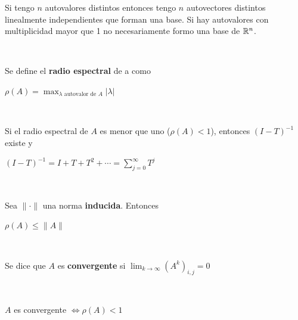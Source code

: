 \documentclass[]{article}
\begin{document}
\begin{prop}
	Si tengo $n$ autovalores distintos entonces tengo $n$ autovectores distintos linealmente independientes que forman una base. Si hay autovalores con multiplicidad mayor que 1 no necesariamente formo una base de $\mathbb{R}^n$.
\end{prop}
~\newline

\begin{defi}
	Se define el \textbf{radio espectral} de a como
	\begin{center}
		$\rho(A) = \displaystyle \max_{\lambda\text{ autovalor de }A} |\lambda|$
	\end{center}
\end{defi}
~\newline

\begin{prop}
		Si el radio espectral de $A$ es menor que uno ($\rho(A)<1$), entonces $(I-T)^{-1}$ existe y
		\begin{center}
			$\displaystyle (I-T)^{-1} = I + T + T^2 + \cdots = \sum_{j=0}^{\infty}{T^j}$
		\end{center}
\end{prop}
~\newline

\begin{prop}\label{radio_vs_norma}
	Sea $\|\cdot\|$ una norma \textbf{inducida}. Entonces
	\begin{center}
		$\rho(A) \leq \|A\|$
	\end{center}
\end{prop}
~\newline

\begin{defi}
	Se dice que $A$ es \textbf{convergente} si $\displaystyle \lim_{k\to \infty}{(A^k)_{i,j}}=0$
\end{defi}
~\newline

\begin{prop}\label{convergencia_espectral}
	$A$ es convergente $\Leftrightarrow \rho(A)<1$
\end{prop}
~\newline
\end{document}
